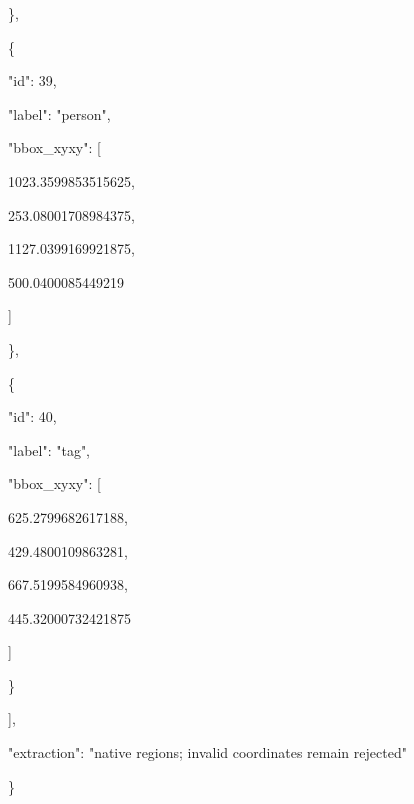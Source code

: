 \documentclass[10pt,a4paper]{article}
\begin{document}
    \},\allowbreak{}\par
    \{\par
      "id":\allowbreak{} 39,\allowbreak{}\par
      "label":\allowbreak{} "person",\allowbreak{}\par
      "bbox\_xyxy":\allowbreak{} [\par
        1023.3599853515625,\allowbreak{}\par
        253.08001708984375,\allowbreak{}\par
        1127.0399169921875,\allowbreak{}\par
        500.0400085449219\par
      ]\par
    \},\allowbreak{}\par
    \{\par
      "id":\allowbreak{} 40,\allowbreak{}\par
      "label":\allowbreak{} "tag",\allowbreak{}\par
      "bbox\_xyxy":\allowbreak{} [\par
        625.2799682617188,\allowbreak{}\par
        429.4800109863281,\allowbreak{}\par
        667.5199584960938,\allowbreak{}\par
        445.32000732421875\par
      ]\par
    \}\par
  ],\allowbreak{}\par
  "extraction":\allowbreak{} "native regions; invalid coordinates remain rejected"\par
\}
\end{document}
